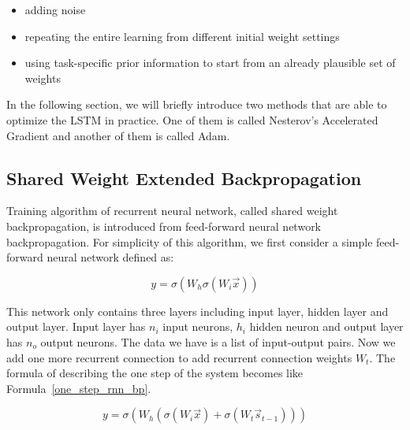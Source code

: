 \documentclass[officiallayout]{tktla}
\begin{document}
\begin{itemize}
\item adding noise
\item repeating the entire learning from different initial weight settings
\item using task-specific prior information to start from an already plausible set of weights
\end{itemize}

In the following section, we will briefly introduce two methods that are able to optimize the LSTM in practice. One of them is called Nesterov's Accelerated Gradient and another of them is called Adam.

\subsection{Shared Weight Extended Backpropagation}

Training algorithm of recurrent neural network, called shared weight backpropagation, is introduced from feed-forward neural network backpropagation. For simplicity of this algorithm, we first consider a simple feed-forward neural network defined as:

\begin{equation}
y = \sigma(W_h\sigma(W_i\vec{x}))
\end{equation}

This network only contains three layers including input layer, hidden layer and output layer. Input layer has $n_i$ input neurons, $h_i$ hidden neuron and output layer has $n_o$ output neurons. The data we have is a list of input-output pairs. Now we add one more recurrent connection to add recurrent connection weights $W_t$. The formula of describing the one step of the system becomes like Formula~\ref{one_step_rnn_bp}.

\begin{equation}
y = \sigma(W_h(\sigma(W_i\vec{x})+\sigma(W_{t}\vec{s}_{t-1}))) \label{one_step_rnn_bp}
\end{equation}
\end{document}
